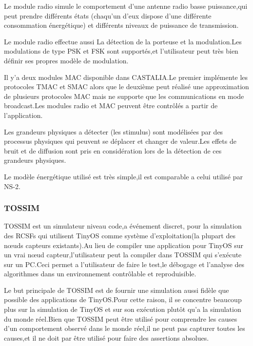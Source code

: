 
Le module radio simule le comportement d'une antenne radio basse puissance,qui peut prendre différents états (chaqu'un d'eux dispose d'une différente consommation énergétique) et différents niveaux de puissance de transmission.

Le module radio effectue aussi La détection de la porteuse et la modulation.Les modulations de type PSK et FSK sont supportés,et l'utilisateur peut très bien définir ses propres modèle de modulation.

Il y'a deux modules MAC disponible dans CASTALIA.Le premier implémente les protocoles TMAC et SMAC alors que le deuxième peut réalisé une approximation de plusieurs protocoles MAC mais ne supporte que les communications en mode broadcast.Les modules radio et MAC peuvent être contrôlés a partir de l'application.

Les grandeurs physiques a détecter (les stimulus) sont modélisées par des processus physiques qui peuvent se déplacer et changer de valeur.Les effets de  bruit et de  diffusion sont pris en considération lors de la détection de ces grandeurs physiques.

Le modèle énergétique utilisé est très simple,il est comparable a celui utilisé par NS-2.

\subsubsection{TOSSIM}
TOSSIM est un simulateur niveau code,a événement discret, pour la simulation des RCSFs qui utilisent TinyOS comme système d'exploitation(la plupart des nœuds capteurs existants).Au lieu de compiler une application pour TinyOS sur un vrai nœud capteur,l'utilisateur peut la compiler dans TOSSIM qui s'exécute sur un PC.Ceci permet a l'utilisateur de faire le test,le débogage et l'analyse des algorithmes dans un environnement contrôlable et reproduisible.

Le but principale de TOSSIM est de fournir une simulation aussi fidèle que possible des applications de TinyOS.Pour cette raison, il se concentre beaucoup plus sur la simulation de TinyOS et sur son exécution plutôt qu'a la simulation du monde réel.Bien que TOSSIM peut être utilisé pour comprendre les causes d'un comportement observé dans le monde réel,il ne peut pas capturer toutes les causes,et il ne doit par être utilisé pour faire des assertions absolues.

